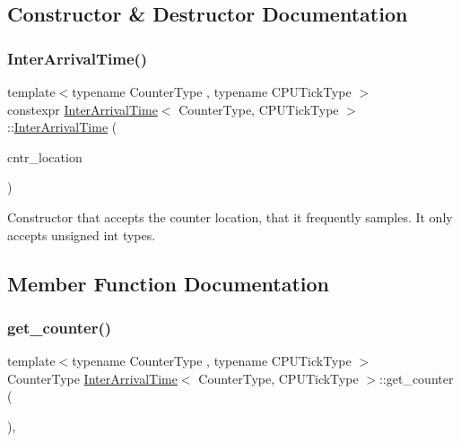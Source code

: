 \subsection{Constructor \& Destructor Documentation}
\mbox{\label{classInterArrivalTime_a2b5ea12da6c38e85b7e92403abcade5f}} 
\subsubsection{\texorpdfstring{Inter\+Arrival\+Time()}{InterArrivalTime()}}
{\footnotesize\ttfamily template$<$typename Counter\+Type , typename C\+P\+U\+Tick\+Type $>$ \\
constexpr \hyperlink{classInterArrivalTime}{Inter\+Arrival\+Time}$<$ Counter\+Type, C\+P\+U\+Tick\+Type $>$\+::\hyperlink{classInterArrivalTime}{Inter\+Arrival\+Time} (\begin{DoxyParamCaption}\item[{const Counter\+Type $\ast$}]{cntr\+\_\+location }\end{DoxyParamCaption})\hspace{0.3cm}{\ttfamily [inline]}}



Constructor that accepts the counter location, that it frequently samples. It only accepts {\ttfamily unsigned int} types. 



\subsection{Member Function Documentation}
\mbox{\label{classInterArrivalTime_a64985dc80cad0a2e79718bad59ca7341}} 
\subsubsection{\texorpdfstring{get\+\_\+counter()}{get\_counter()}}
{\footnotesize\ttfamily template$<$typename Counter\+Type , typename C\+P\+U\+Tick\+Type $>$ \\
Counter\+Type \hyperlink{classInterArrivalTime}{Inter\+Arrival\+Time}$<$ Counter\+Type, C\+P\+U\+Tick\+Type $>$\+::get\+\_\+counter (\begin{DoxyParamCaption}{ }\end{DoxyParamCaption})\hspace{0.3cm}{\ttfamily [inline]}, {\ttfamily [private]}}

